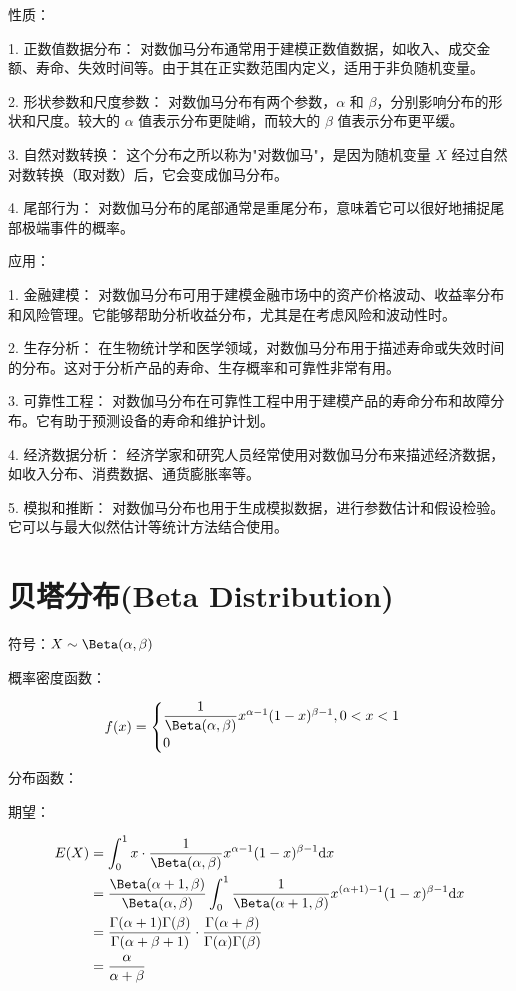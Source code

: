 \documentclass[12pt, a4paper, oneside]{ctexbook}
\begin{document}
性质：

1. 正数值数据分布： 对数伽马分布通常用于建模正数值数据，如收入、成交金额、寿命、失效时间等。由于其在正实数范围内定义，适用于非负随机变量。

2. 形状参数和尺度参数： 对数伽马分布有两个参数，$\alpha$ 和 $\beta$，分别影响分布的形状和尺度。较大的 $\alpha$ 值表示分布更陡峭，而较大的 $\beta$ 值表示分布更平缓。

3. 自然对数转换： 这个分布之所以称为"对数伽马"，是因为随机变量 $X$ 经过自然对数转换（取对数）后，它会变成伽马分布。

4. 尾部行为： 对数伽马分布的尾部通常是重尾分布，意味着它可以很好地捕捉尾部极端事件的概率。

应用：

1. 金融建模： 对数伽马分布可用于建模金融市场中的资产价格波动、收益率分布和风险管理。它能够帮助分析收益分布，尤其是在考虑风险和波动性时。

2. 生存分析： 在生物统计学和医学领域，对数伽马分布用于描述寿命或失效时间的分布。这对于分析产品的寿命、生存概率和可靠性非常有用。

3. 可靠性工程： 对数伽马分布在可靠性工程中用于建模产品的寿命分布和故障分布。它有助于预测设备的寿命和维护计划。

4. 经济数据分析： 经济学家和研究人员经常使用对数伽马分布来描述经济数据，如收入分布、消费数据、通货膨胀率等。

5. 模拟和推断： 对数伽马分布也用于生成模拟数据，进行参数估计和假设检验。它可以与最大似然估计等统计方法结合使用。

\section{贝塔分布(Beta Distribution)}

符号：$X \sim \Beta(\alpha, \beta)$

 概率密度函数：

$$
f(x) = \begin{cases}
\dfrac{1}{\Beta(\alpha, \beta)} x^{\alpha - 1}(1-x)^{\beta - 1}, 0 < x < 1 \\
0
\end{cases}
$$

分布函数：

期望：

\[
\begin{aligned}
E(X) &= \int_0^{1}x \cdot \frac{1}{\Beta(\alpha, \beta)} x^{\alpha - 1}(1-x)^{\beta - 1} \mathrm{d}x \\
&= \frac{\Beta(\alpha + 1, \beta)}{\Beta(\alpha, \beta)} \int_0^{1}\frac{1}{\Beta(\alpha + 1, \beta)} x^{(\alpha + 1) - 1}(1-x)^{\beta - 1} \mathrm{d}x \\
&= \frac{\Gamma(\alpha + 1)\Gamma(\beta)}{\Gamma(\alpha + \beta + 1)} \cdot \frac{\Gamma(\alpha + \beta)}{\Gamma(\alpha)\Gamma(\beta)} \\
&= \frac{\alpha}{\alpha + \beta}
\end{aligned}
\]
\end{document}
